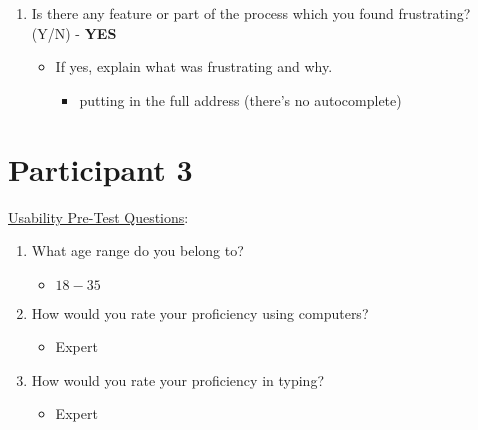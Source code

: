 \documentclass[12pt]{article}
\begin{document}
\begin{enumerate}
\begin{itemize}
\begin{itemize}
        \end{itemize}
      \end{itemize}
    \item  Is there any feature or part of the process which you found frustrating? (Y/N) - \textbf{YES}
      \begin{itemize}
        \item If yes, explain what was frustrating and why.
        \begin{itemize}
          \item putting in the full address (there's no autocomplete)
        \end{itemize}
      \end{itemize}
\end{enumerate}

\section{Participant 3}
\underline{Usability Pre-Test Questions}:
\begin{enumerate}
  \item What age range do you belong to?
    \begin{itemize}
      \item $18 - 35$
    \end{itemize}
	\item How would you rate your proficiency using computers?
    \begin{itemize}
      \item Expert
    \end{itemize}
  \item How would you rate your proficiency in typing?
    \begin{itemize}
      \item Expert
    \end{itemize}
\end{enumerate}
\end{document}
